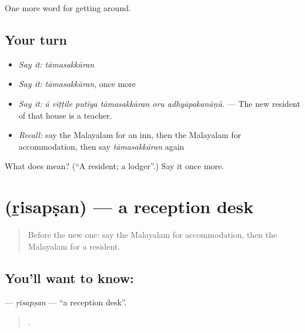 \begin{grammarlens}[title={What you've built}]
One more word for getting around.
\end{grammarlens}

\subsection*{Your turn}
\begin{itemize}
\raggedright
  \item \emph{Say it:} \emph{tāmasakkāran}
  \item \emph{Say it:} \emph{tāmasakkāran}, once more
  \item \emph{Say it:} \emph{ā vīṭṭile putiya tāmasakkāran oru adhyāpakanāṇŭ.} — The new resident of that house is a teacher.
  \item \emph{Recall:} say the Malayalam for an inn, then the Malayalam for accommodation, then say \emph{tāmasakkāran} again
\end{itemize}

\begin{tcolorbox}[breakable,colback=teal!4,colframe=teal!35!black,title={Before you move on}]
What does  mean? (\textquotedblleft{}A resident; a lodger\textquotedblright{}.) Say it once more.
\end{tcolorbox}
\section[\texorpdfstring{\ml{റിസപ്ഷൻ} (ṟisapṣan)}{റിസപ്ഷൻ (ṟisapṣan)}]{ (ṟisapṣan) — a reception desk}

\label{lesson:ML-C481-risapsan}



\begin{quote}
Before the new one: say the Malayalam for accommodation, then the Malayalam for a resident.
\end{quote}

\subsection*{You'll want to know: }
\textbf{} — \emph{ṟisapṣan} — \textquotedblleft{}a reception desk\textquotedblright{}.

\begin{quote}
     .
\end{quote}

